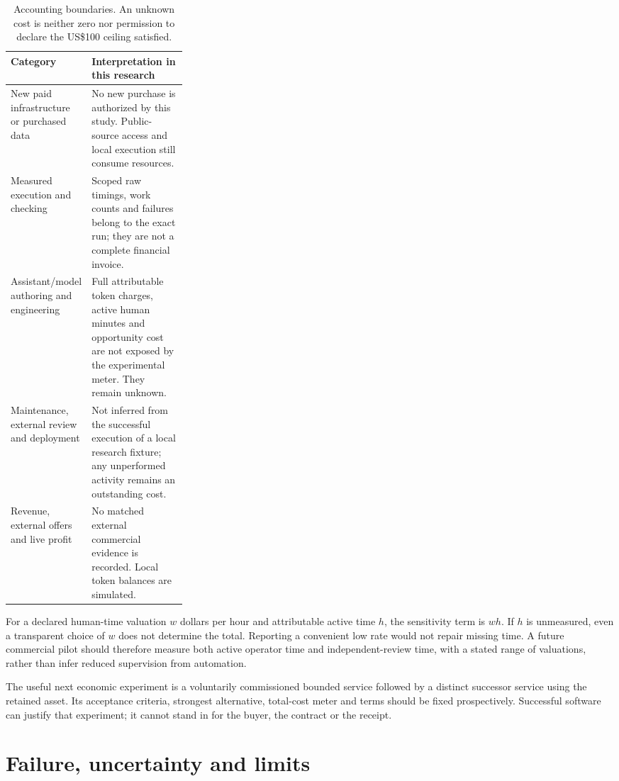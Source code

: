 \documentclass[11pt]{article}
\begin{document}
\begin{table}[htbp]
\centering
\small
\begin{tabularx}{\linewidth}{P{0.29\linewidth}Y}
\toprule
\textbf{Category} & \textbf{Interpretation in this research}\\
\midrule
New paid infrastructure or purchased data & No new purchase is authorized by this study. Public-source access and local execution still consume resources.\\
Measured execution and checking & Scoped raw timings, work counts and failures belong to the exact run; they are not a complete financial invoice.\\
Assistant/model authoring and engineering & Full attributable token charges, active human minutes and opportunity cost are not exposed by the experimental meter. They remain unknown.\\
Maintenance, external review and deployment & Not inferred from the successful execution of a local research fixture; any unperformed activity remains an outstanding cost.\\
Revenue, external offers and live profit & No matched external commercial evidence is recorded. Local token balances are simulated.\\
\bottomrule
\end{tabularx}
\caption{Accounting boundaries. An unknown cost is neither zero nor permission to declare the US\$100 ceiling satisfied.}
\end{table}

For a declared human-time valuation $w$ dollars per hour and attributable active time $h$, the sensitivity term is $wh$. If $h$ is unmeasured, even a transparent choice of $w$ does not determine the total. Reporting a convenient low rate would not repair missing time. A future commercial pilot should therefore measure both active operator time and independent-review time, with a stated range of valuations, rather than infer reduced supervision from automation.

The useful next economic experiment is a voluntarily commissioned bounded service followed by a distinct successor service using the retained asset. Its acceptance criteria, strongest alternative, total-cost meter and terms should be fixed prospectively. Successful software can justify that experiment; it cannot stand in for the buyer, the contract or the receipt.



\section{Failure, uncertainty and limits}
\end{document}
